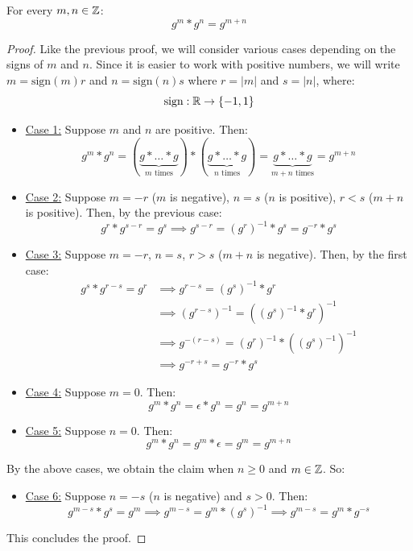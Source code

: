 \documentclass[letterpaper]{article}
\begin{document}
\begin{lemma}{}{}
    For every $m, n \in \mathbb{Z}$: 
    \[g^m * g^n = g^{m + n}\]
\end{lemma}

\begin{mdframed}
    \begin{proof}
        Like the previous proof, we will consider various cases depending on the signs of $m$ and $n$. Since it is easier to work with positive numbers, we will write $m = \text{sign}(m) r$ and $n = \text{sign}(n) s$ where $r = |m|$ and $s = |n|$, where: 
        \[\text{sign}: \mathbb{R} \to \{-1, 1\}\]
        \begin{itemize}
            \item \underline{Case 1:} Suppose $m$ and $n$ are positive. Then: 
            \[g^m * g^n = (\underbrace{g * \dots * g}_{m \text{ times}}) * (\underbrace{g * \dots * g}_{n \text{ times}}) = \underbrace{g * \dots * g}_{m + n \text{ times}} = g^{m + n}\]
    
            \item \underline{Case 2:} Suppose $m = -r$ ($m$ is negative), $n = s$ ($n$ is positive), $r < s$ ($m + n$ is positive). Then, by the previous case:
            \[g^r * g^{s - r} = g^s \implies g^{s - r} = (g^r)^{-1} * g^s = g^{-r} * g^s\]  
    
            \item \underline{Case 3:} Suppose $m = -r$, $n = s$, $r > s$ ($m + n$ is negative). Then, by the first case: 
            \begin{equation*}
                \begin{aligned}
                    g^s * g^{r - s} = g^r &\implies g^{r - s} = (g^s)^{-1} * g^r \\ 
                        &\implies (g^{r - s})^{-1} = ((g^s)^{-1} * g^r)^{-1} \\ 
                        &\implies g^{-(r - s)} = (g^r)^{-1} * ((g^s)^{-1})^{-1} \\ 
                        &\implies g^{-r + s} = g^{-r} * g^s
                \end{aligned}
            \end{equation*}
    
            \item \underline{Case 4:} Suppose $m = 0$. Then: 
            \[g^m * g^n  = \epsilon * g^n = g^n = g^{m + n}\]
    
            \item \underline{Case 5:} Suppose $n = 0$. Then: 
            \[g^m * g^n = g^m * \epsilon = g^m = g^{m + n}\]
        \end{itemize}
        By the above cases, we obtain the claim when $n \geq 0$ and $m \in \mathbb{Z}$. So: 
        \begin{itemize}
            \item \underline{Case 6:} Suppose $n = -s$ ($n$ is negative) and $s > 0$. Then: 
            \[g^{m - s} * g^s = g^m \implies g^{m - s} = g^m * (g^s)^{-1} \implies g^{m - s} = g^m * g^{-s}\]
        \end{itemize}
        This concludes the proof. 
    \end{proof}
\end{mdframed}
\end{document}
